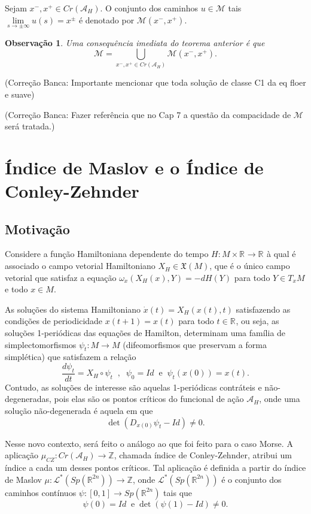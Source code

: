 \documentclass[12pt]{book}
\newtheorem{observacao}[teorema]{Observação}
\newcommand{\caminhosespeciais}[1]{\mathcal{L}^{*}(#1)}
\newcommand{\campohamiltoniano}[1]{X_{H}(#1)}
\newcommand{\campohamiltonianoabrev}{X_{H}}
\newcommand{\campossuaves}[1]{\mathfrak{X}(#1)}
\newcommand{\derivada}[2]{\frac{d #1}{d #2}}
\newcommand{\energiafinitaM}{\mathcal{M}}
\newcommand{\energiafinitaMconectante}{\energiafinitaM(x^{-}, x^{+})}
\newcommand{\espacotangenteponto}[2]{T_{#1}#2}
\newcommand{\funcionalH}{\mathcal{A}_{H}}
\newcommand{\gruposimpletico}[1]{Sp(#1)}
\newcommand{\iconleyabrev}{\mu_{CZ}}
\newcommand{\inteiros}{\mathbb{Z}}
\newcommand{\intervalo}{[0,1]}
\newcommand{\pontoscriticos}[1]{\textit{Cr}(#1)}
\newcommand{\real}[1]{\mathbb{R}^{#1}}
\newcommand{\reta}{\real{}}
\newcommand{\alerta}[1]{{\color{red}#1}}
\newcommand{\correcaobanca}[1]{\alerta{(Correção Banca: #1)}}
\begin{document}
	Sejam $x^{-}, x^{+}\in \pontoscriticos{\funcionalH}$. O conjunto dos caminhos $u \in \energiafinitaM$ tais $\lim\limits_{s\to \pm \infty}u(s) = x^{\pm}$ é denotado por $\energiafinitaMconectante$.

	\begin{observacao}\label{observacao_uniao_orbitas_conectantes}
		Uma consequência imediata do teorema anterior é que 
		$$
		\energiafinitaM = \bigcup_{x^{-}, x^{+} \in \pontoscriticos{\funcionalH}} \energiafinitaMconectante.
		$$
	\end{observacao}

	\correcaobanca{Importante mencionar que toda solução de classe C1 da eq floer e suave}
	
	\correcaobanca{Fazer referência que no Cap 7 a questão da compacidade de $\energiafinitaM$ será tratada.}
	
	\chapter{Índice de Maslov e o Índice de Conley-Zehnder}\label{capitulo_indice_maslov}
	\section{Motivação}
	Considere a função Hamiltoniana dependente do tempo $H:M\times \reta\to \reta$ à qual é associado o campo vetorial Hamiltoniano $X_{H} \in \campossuaves{M}$, que é o único campo vetorial que satisfaz a equação $\omega_{x}(\campohamiltoniano{x}, Y) = -dH(Y)$ para todo $Y \in \espacotangenteponto{x}{M}$ e todo $x \in M$. 
	
	As soluções do sistema Hamiltoniano $\dot{x}(t) = X_{H}(x(t), t)$ satisfazendo as condições de periodicidade $x(t+1) = x(t)$ para todo $t\in \reta$, ou seja, as soluções 1-periódicas das equações de Hamilton, determinam uma família de simplectomorfismos $\psi_{t}:M \to M$ (difeomorfismos que preservam a forma simplética) que satisfazem a relação 
	$$
	\derivada{\psi_{t}}{t}=\campohamiltonianoabrev\circ\psi_{t} \;\;, \;\; \psi_{0}=Id \;\;\text{e}\;\;  \psi_{t}(x(0)) = x(t).
	$$
	Contudo, as soluções de interesse são aquelas 1-periódicas contráteis e não-degeneradas, pois elas são os pontos críticos do funcional de ação $\funcionalH$, onde uma solução não-degenerada é aquela em que 
	$$
	\det(D_{x(0)}\psi_{t} -Id)\neq 0.
	$$
	
	
	Nesse novo contexto, será feito o análogo ao que foi feito para o caso Morse. A aplicação $\iconleyabrev:\pontoscriticos{\funcionalH} \to \inteiros$, chamada índice de Conley-Zehnder, atribui um índice a cada um desses pontos críticos. Tal aplicação é definida a partir do índice de Maslov $\mu:\caminhosespeciais{\gruposimpletico{\real{2n}}} \to \inteiros$, onde $\caminhosespeciais{\gruposimpletico{\real{2n}}}$ é o conjunto dos caminhos contínuos $\psi:\intervalo \to \gruposimpletico{\real{2n}}$ tais que 
	$$
	\psi(0)=Id\;\;\text{e}\;\det(\psi(1)-Id)\neq 0.
	$$
	
\end{document}
